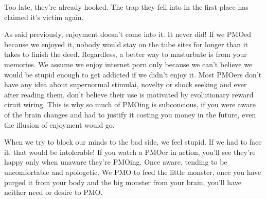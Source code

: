 \documentclass[easypeasy.tex]{subfiles}
\begin{document}
Too late, they're already hooked. The trap they fell into in the first place has claimed it's victim again.

As said previously, enjoyment doesn't come into it. It never did! If we PMOed because we enjoyed it, nobody would stay on the tube sites for longer than it takes to finish the deed. Regardless, a better way to masturbate is from your memories. We assume we enjoy internet porn only because we can't believe we would be stupid enough to get addicted if we didn't enjoy it. Most PMOers don't have any idea about supernormal stimulai, novelty or shock seeking and ever after reading them, don't believe their use is motivated by evolutionary reward ciruit wiring. This is why so much of PMOing is subconcious, if you were aware of the brain changes and had to justify it costing you money in the future, even the illusion of enjoyment would go.

When we try to block our minds to the bad side, we feel stupid. If we had to face it, that would be intolerable! If you watch a PMOer in action, you'll see they're happy only when unaware they're PMOing. Once aware, tending to be uncomfortable and apologetic. We PMO to feed the little monster, once you have purged it from your body and the big monster from your brain, you'll have neither need or desire to PMO.
\end{document}
